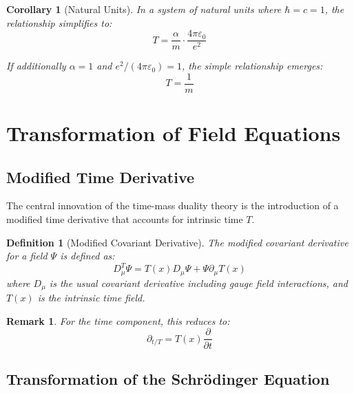 \documentclass[a4paper,12pt]{article}
\newtheorem{corollary}[theorem]{Corollary}
\newtheorem{definition}{Definition}[section]
\newtheorem{remark}{Remark}[section]
\begin{document}
	\begin{corollary}[Natural Units]
		In a system of natural units where \( \hbar = c = 1 \), the relationship simplifies to:
		\begin{equation}
			T = \frac{\alpha}{m} \cdot \frac{4\pi \varepsilon_0}{e^2}
		\end{equation}
		
		If additionally \( \alpha = 1 \) and \( e^2/(4\pi \varepsilon_0) = 1 \), the simple relationship emerges:
		\begin{equation}
			T = \frac{1}{m}
		\end{equation}
	\end{corollary}
	
	\section{Transformation of Field Equations}
	
	\subsection{Modified Time Derivative}
	
	The central innovation of the time-mass duality theory is the introduction of a modified time derivative that accounts for intrinsic time \( T \).
	
	\begin{definition}[Modified Covariant Derivative]
		The modified covariant derivative for a field \( \Psi \) is defined as:
		\begin{equation}
			D_\mu^T \Psi = T(x) D_\mu \Psi + \Psi \partial_\mu T(x)
		\end{equation}
		where \( D_\mu \) is the usual covariant derivative including gauge field interactions, and \( T(x) \) is the intrinsic time field.
	\end{definition}
	
	\begin{remark}
		For the time component, this reduces to:
		\begin{equation}
			\partial_{t/T} = T(x) \frac{\partial}{\partial t}
		\end{equation}
	\end{remark}
	
	\subsection{Transformation of the Schrödinger Equation}
	
\end{document}
